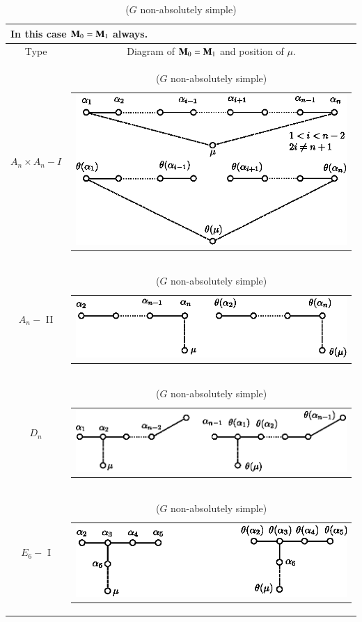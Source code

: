 {
\tabcolsep=3pt\pageoriginale
\begin{longtable}{@{}|c|c|@{}}
\caption{($G$ non-absolutely simple)}\\
\multicolumn{2}{l}{In this case $\mathbf{M}_0 =\mathbf{M}_1$ always.}\\\hline
Type & Diagram of $\mathbf{M}_0 = \mathbf{M}_1$ and position of $\mu$. \\\hline
$A_n \times A_n - I$ & 
\begin{tabular}{c}
{\includegraphics[scale=0.8]{307a.eps}}
\end{tabular}\\\hline
$A_n - $ II &
\begin{tabular}{c}
{\includegraphics[scale=0.8]{307b.eps}}
\end{tabular}\\\hline
$D_n$ & 
\begin{tabular}{c}
{\includegraphics[scale=0.8]{307c.eps}}
\end{tabular}\\\hline
$E_6 - $ I &
\begin{tabular}{c}
{\includegraphics[scale=0.8]{307d.eps}}

\end{tabular}
\end{longtable}}
